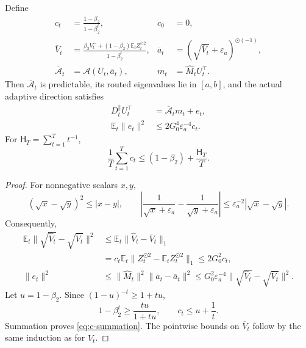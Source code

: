 \begin{lemma}
\label{lem:predictable-denominator}
Define
\begin{align}
 c_t&=\frac{1-\beta_2}{1-\beta_2^t},&c_0&=0,\\
 \overline V_t
 &=\frac{\beta_2V_t^-+(1-\beta_2)\mathbb E_tZ_t^{\odot2}}
                   {1-\beta_2^t},&
 \overline a_t&=(\sqrt{\overline V_t}+\varepsilon_a)^{\odot(-1)},\\
 \overline{\mathcal A}_t&=\mathcal A(U_t,\overline a_t),&
 m_t&=\widehat M_tU_t^\top.
\end{align}
Then $\overline{\mathcal A}_t$ is predictable, its routed eigenvalues lie
in $[a,b]$, and the actual adaptive direction satisfies
\begin{align}
 D_t^\parallel U_t^\top
 &=\overline{\mathcal A}_tm_t+e_t,\\
 \mathbb E_t\|e_t\|^2
 &\le2G_0^4\varepsilon_a^{-4}c_t.\label{eq:same-batch-defect}
\end{align}
For $\mathsf H_T=\sum_{t=1}^Tt^{-1}$,
\begin{equation}
 \frac1T\sum_{t=1}^Tc_t
 \le(1-\beta_2)+\frac{\mathsf H_T}{T}.\label{eq:c-summation}
\end{equation}
\end{lemma}
\begin{proof}
For nonnegative scalars $x,y$,
\begin{equation}
 (\sqrt x-\sqrt y)^2\le|x-y|,\qquad
 \left|\frac1{\sqrt x+\varepsilon_a}
       -\frac1{\sqrt y+\varepsilon_a}\right|
 \le\varepsilon_a^{-2}|\sqrt x-\sqrt y|.
\end{equation}
Consequently,
\begin{align}
 \mathbb E_t\|\sqrt{\widehat V_t}-\sqrt{\overline V_t}\|^2
 &\le\mathbb E_t\|\widehat V_t-\overline V_t\|_1\\
 &=c_t\mathbb E_t\|Z_t^{\odot2}-\mathbb E_tZ_t^{\odot2}\|_1
 \le2G_0^2c_t,\\
 \|e_t\|^2
 &\le\|\widehat M_t\|^2\|a_t-\overline a_t\|^2
 \le G_0^2\varepsilon_a^{-4}
                 \|\sqrt{\widehat V_t}-\sqrt{\overline V_t}\|^2.
\end{align}
Let $u=1-\beta_2$. Since
$(1-u)^{-t}\ge1+tu$,
\begin{equation}
 1-\beta_2^t\ge\frac{tu}{1+tu},\qquad
 c_t\le u+\frac1t.
\end{equation}
Summation proves \eqref{eq:c-summation}. The pointwise bounds on
$\overline V_t$ follow by the same induction as for $\widehat V_t$.
\end{proof}

